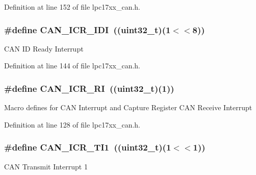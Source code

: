 \-Definition at line 152 of file lpc17xx\-\_\-can.\-h.

\hypertarget{group___c_a_n___private___macros_gab57b8c6d33827a856266f8340052ce84}{
\subsubsection[{\-C\-A\-N\-\_\-\-I\-C\-R\-\_\-\-I\-D\-I}]{\setlength{\rightskip}{0pt plus 5cm}\#define {\bf \-C\-A\-N\-\_\-\-I\-C\-R\-\_\-\-I\-D\-I}~((uint32\-\_\-t)(1$<$$<$8))}}\label{group___c_a_n___private___macros_gab57b8c6d33827a856266f8340052ce84}
\-C\-A\-N \-I\-D \-Ready \-Interrupt 

\-Definition at line 144 of file lpc17xx\-\_\-can.\-h.

\hypertarget{group___c_a_n___private___macros_ga7d64f1d188b6121983be38f7d688c6d0}{
\subsubsection[{\-C\-A\-N\-\_\-\-I\-C\-R\-\_\-\-R\-I}]{\setlength{\rightskip}{0pt plus 5cm}\#define {\bf \-C\-A\-N\-\_\-\-I\-C\-R\-\_\-\-R\-I}~((uint32\-\_\-t)(1))}}\label{group___c_a_n___private___macros_ga7d64f1d188b6121983be38f7d688c6d0}
\-Macro defines for \-C\-A\-N \-Interrupt and \-Capture \-Register \-C\-A\-N \-Receive \-Interrupt 

\-Definition at line 128 of file lpc17xx\-\_\-can.\-h.

\hypertarget{group___c_a_n___private___macros_ga4a568e35c08d16197f943bcdaf48b4de}{
\subsubsection[{\-C\-A\-N\-\_\-\-I\-C\-R\-\_\-\-T\-I1}]{\setlength{\rightskip}{0pt plus 5cm}\#define {\bf \-C\-A\-N\-\_\-\-I\-C\-R\-\_\-\-T\-I1}~((uint32\-\_\-t)(1$<$$<$1))}}\label{group___c_a_n___private___macros_ga4a568e35c08d16197f943bcdaf48b4de}
\-C\-A\-N \-Transmit \-Interrupt 1 

